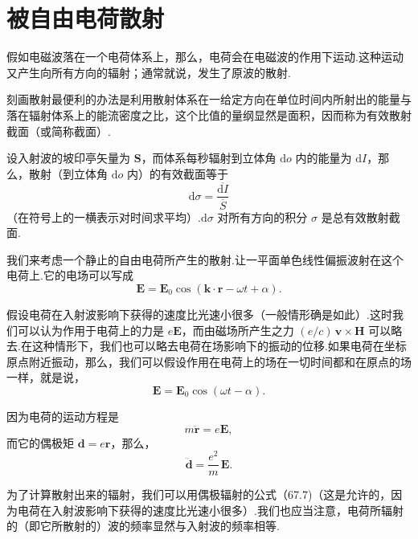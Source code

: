 \section{被自由电荷散射}

假如电磁波落在一个电荷体系上，那么，电荷会在电磁波的作用下运动.这种运动又产生向所有方向的辐射；通常就说，发生了原波的散射.

刻画散射最便利的办法是利用散射体系在一给定方向在单位时间内所射出的能量与落在辐射体系上的能流密度之比，这个比值的量纲显然是面积，因而称为有效散射截面（或简称截面）.

设入射波的坡印亭矢量为 $\boldsymbol{S}$，而体系每秒辐射到立体角 $\mathrm{d}o$ 内的能量为 $\mathrm{d}I$，那么，散射（到立体角 $\mathrm{d}o$ 内）的有效截面等于
\begin{equation}
  \mathrm{d}\sigma=\frac{\overline{\mathrm{d}I}}{\overline{S}}
\end{equation}
（在符号上的一横表示对时间求平均）.$\mathrm{d}\sigma$ 对所有方向的积分 $\sigma$ 是总有效散射截面.

我们来考虑一个静止的自由电荷所产生的散射.让一平面单色线性偏振波射在这个电荷上.它的电场可以写成
\begin{equation*}
  \boldsymbol{E}=\boldsymbol{E}_0\cos(\boldsymbol{k}\cdot\boldsymbol{r}-\omega t+\alpha).
\end{equation*}

假设电荷在入射波影响下获得的速度比光速小很多（一般情形确是如此）.这时我们可以认为作用于电荷上的力是 $e\boldsymbol{E}$，而由磁场所产生之力 $(e/c)\,\boldsymbol{v}\times\boldsymbol{H}$ 可以略去.在这种情形下，我们也可以略去电荷在场影响下的振动的位移.如果电荷在坐标原点附近振动，那么，我们可以假设作用在电荷上的场在一切时间都和在原点的场一样，就是说，
\begin{equation*}
  \boldsymbol{E}=\boldsymbol{E}_0\cos(\omega t-\alpha).
\end{equation*}

因为电荷的运动方程是
\begin{equation*}
  m\ddot{\boldsymbol{r}}=e\boldsymbol{E},
\end{equation*}
而它的偶极矩 $\boldsymbol{d}=e\boldsymbol{r}$，那么，
\begin{equation}
  \ddot{\boldsymbol{d}}=\frac{e^2}{m}\,\boldsymbol{E}.
\end{equation}

为了计算散射出来的辐射，我们可以用偶极辐射的公式（67.7)（这是允许的，因为电荷在入射波影响下获得的速度比光速小很多）.我们也应当注意，电荷所辐射的（即它所散射的）波的频率显然与入射波的频率相等.

